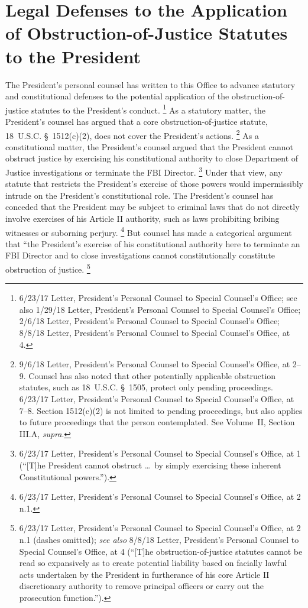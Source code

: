 \section{Legal Defenses to the Application of Obstruction-of-Justice Statutes to the President}

The President's personal counsel has written to this Office to advance statutory and constitutional defenses to the potential application of the obstruction-of-justice statutes to the President's conduct.%
\footnote{6/23/17 Letter, President's Personal Counsel to Special Counsel's Office;
see also 1/29/18 Letter, President's Personal Counsel to Special Counsel's Office;
2/6/18 Letter, President's Personal Counsel to Special Counsel's Office;
8/8/18 Letter, President's Personal Counsel to Special Counsel's Office, at 4.}
As a statutory matter, the President's counsel has argued that a core obstruction-of-justice statute, 18~U.S.C. \S~1512(c)(2), does not cover the President's actions.%
\footnote{9/6/18 Letter, President's Personal Counsel to Special Counsel's Office, at 2--9.
Counsel has also noted that other potentially applicable obstruction statutes, such as 18~U.S.C. \S~1505, protect only pending proceedings.
6/23/17 Letter, President's Personal Counsel to Special Counsel's Office, at 7--8.
Section 1512(c)(2) is not limited to pending proceedings, but also applies to future proceedings that the person contemplated.
See Volume~II, Section III.A, \textit{supra}.}
As a constitutional matter, the President's counsel argued that the President cannot obstruct justice by exercising his constitutional authority to close Department of Justice investigations or terminate the FBI Director.%
\footnote{6/23/17 Letter, President's Personal Counsel to Special Counsel's Office, at 1 (``[T]he President cannot obstruct \dots\ by simply exercising these inherent Constitutional powers.'').}
Under that view, any statute that restricts the President's exercise of those powers would impermissibly intrude on the President's constitutional role.
The President's counsel has conceded that the President may be subject to criminal laws that do not directly involve exercises of his Article II authority, such as laws prohibiting bribing witnesses or suborning perjury.%
\footnote{6/23/17 Letter, President's Personal Counsel to Special Counsel's Office, at 2 n.1.}
But counsel has made a categorical argument that ``the President's exercise of his constitutional authority here to terminate an FBI Director and to close investigations cannot constitutionally constitute obstruction of justice.%
\footnote{6/23/17 Letter, President's Personal Counsel to Special Counsel's Office, at 2 n.1 (dashes omitted);
\textit{see also} 8/8/18 Letter, President's Personal Counsel to Special Counsel's Office, at 4 (``[T]he obstruction-of-justice statutes cannot be read so expansively as to create potential liability based on facially lawful acts undertaken by the President in furtherance of his core Article II discretionary authority to remove principal officers or carry out the prosecution function.'').}

